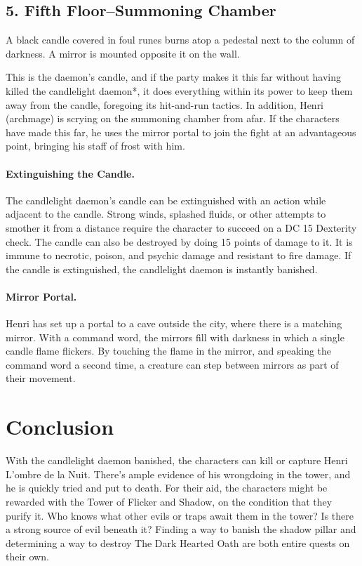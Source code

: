 \documentclass[10pt,a4paper,twoside,twocolumn,openany,bg=print,nodeprecatedcode]{dndbook}
\begin{document}
\subsection{5. Fifth Floor–Summoning Chamber}
\begin{DndReadAloud}{}
A black candle covered in foul runes burns atop a pedestal next to the column of darkness. A mirror is mounted opposite it on the wall.
\end{DndReadAloud}

This is the daemon's candle, and if the party makes it this far without having killed the candlelight daemon*, it does everything within its power to keep them away from the candle, foregoing its hit-and-run tactics. In addition, Henri (archmage) is scrying on the summoning chamber from afar. If the characters have made this far, he uses the mirror portal to join the fight at an advantageous point, bringing his staff of frost with him.
\paragraph{Extinguishing the Candle.}
The candlelight daemon's candle can be extinguished with an action while adjacent to the candle. Strong winds, splashed fluids, or other attempts to smother it from a distance require the character to succeed on a DC 15 Dexterity check. The candle can also be destroyed by doing 15 points of damage to it. It is immune to necrotic, poison, and psychic damage and resistant to fire damage. If the candle is extinguished, the candlelight daemon is instantly banished.
\paragraph{Mirror Portal.}
Henri has set up a portal to a cave outside the city, where there is a matching mirror. With a command word, the mirrors fill with darkness in which a single candle flame flickers. By touching the flame in the mirror, and speaking the command word a second time, a creature can step between mirrors as part of their movement.
\section{Conclusion}
With the candlelight daemon banished, the characters can kill or capture Henri L'ombre de la Nuit. There's ample evidence of his wrongdoing in the tower, and he is quickly tried and put to death. For their aid, the characters might be rewarded with the Tower of Flicker and Shadow, on the condition that they purify it. Who knows what other evils or traps await them in the tower? Is there a strong source of evil beneath it? Finding a way to banish the shadow pillar and determining a way to destroy The Dark Hearted Oath are both entire quests on their own.
\end{document}
